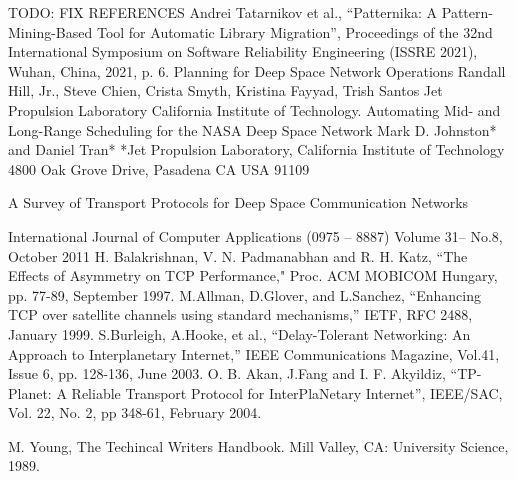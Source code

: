 \documentclass[letterpaper, 10 pt, conference]{ieeeconf}  %
\begin{document}









\begin{thebibliography}{99}
 TODO: FIX REFERENCES
 Andrei Tatarnikov et al., “Patternika: A
Pattern-Mining-Based Tool for Automatic Library Migration”,
Proceedings of the 32nd International Symposium on Software
Reliability Engineering (ISSRE 2021), Wuhan, China, 2021, p. 6.
 Planning for Deep Space Network Operations
Randall Hill, Jr., Steve Chien, Crista Smyth, Kristina Fayyad, Trish Santos
Jet Propulsion Laboratory
California Institute of Technology.
 Automating Mid- and Long-Range Scheduling for the NASA Deep Space Network
Mark D. Johnston* and Daniel Tran*
*Jet Propulsion Laboratory, California Institute of Technology
4800 Oak Grove Drive, Pasadena CA USA 91109

 A Survey of Transport Protocols for Deep Space
Communication Networks

International Journal of Computer Applications (0975 – 8887)
Volume 31– No.8, October 2011
 H. Balakrishnan, V. N. Padmanabhan and R. H. Katz, “The Effects of Asymmetry on TCP Performance," Proc. ACM MOBICOM Hungary, pp. 77-89, September 1997.
 M.Allman, D.Glover, and L.Sanchez, “Enhancing TCP over satellite channels using standard mechanisms,” IETF, RFC 2488, January 1999.
S.Burleigh, A.Hooke, et al., “Delay-Tolerant Networking: An Approach to Interplanetary Internet,” IEEE Communications Magazine, Vol.41, Issue 6, pp. 128-136, June 2003.
 O. B. Akan, J.Fang and I. F. Akyildiz, “TP-Planet: A Reliable Transport Protocol for InterPlaNetary Internet”, IEEE/SAC, Vol. 22, No. 2, pp 348-61, February 2004.


  M. Young, The Techincal Writers Handbook. Mill Valley, CA: University
Science, 1989.



\end{thebibliography}
\end{document}
